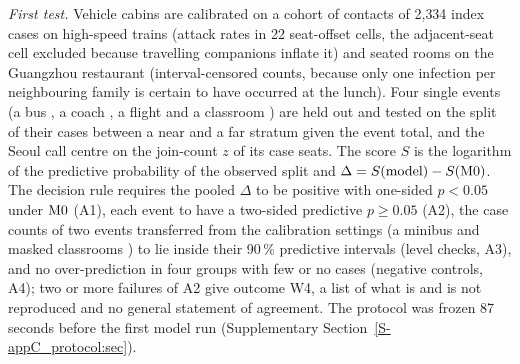 \emph{First test.} Vehicle cabins are calibrated on a cohort of contacts of 2{,}334 index cases on high-speed
trains \citep{hu2021} (attack rates in 22 seat-offset cells, the adjacent-seat cell excluded because travelling
companions inflate it) and seated rooms on the Guangzhou restaurant \citep{lu2020,li2021} (interval-censored
counts, because only one infection per neighbouring family is certain to have occurred at the lunch). Four
single events (a bus \citep{shen2020}, a coach \citep{luo2020,ou2022}, a flight \citep{khanh2020} and a
classroom \citep{lamhine2021}) are held out and tested on the split of their cases
between a near and a far stratum given the event total, and the Seoul call centre \citep{park2020} on the
join-count $z$ of its case seats. The score $S$ is the logarithm of the predictive probability of the observed
split and $\Delta=S(\text{model})-S(\mathrm{M0})$. The decision rule requires the pooled $\Delta$ to be positive with
one-sided $p<0.05$ under $\mathrm{M0}$ (A1), each event to have a two-sided predictive $p\ge0.05$ (A2), the case
counts of two events transferred from the calibration settings (a minibus \citep{luo2020} and masked
classrooms \citep{hershow2021}) to lie inside
their 90\,\% predictive intervals (level checks, A3), and no over-prediction in four groups with few or no cases
(negative controls, A4); two or more failures of A2 give outcome W4, a list of what is and is not
reproduced and no general statement of agreement. The protocol was frozen 87 seconds before the first model run
(Supplementary Section~\ref{S-appC_protocol:sec}).

